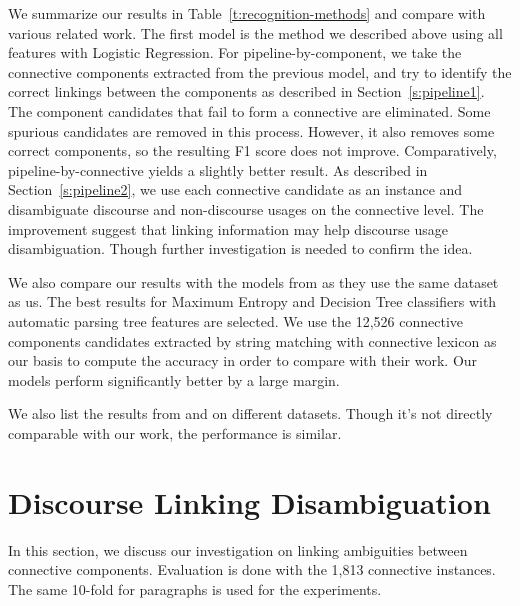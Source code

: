 

We summarize our results in Table~\ref{t:recognition-methods} and
compare with various related work. The first model is the method we described above
using all features with Logistic Regression. For pipeline-by-component,
we take the connective components extracted from the previous model, and try to
identify the correct linkings between the components as described in Section~\ref{s:pipeline1}.
The component candidates that fail to form a connective are eliminated.
Some spurious candidates are removed in this process. However, it also removes some
correct components, so the resulting F1 score does not improve. Comparatively,
pipeline-by-connective yields a slightly better result. As described in
Section~\ref{s:pipeline2}, we use each connective candidate as an instance and
disambiguate discourse and non-discourse usages on the connective level.
The improvement suggest that linking information may help discourse usage disambiguation.
Though further investigation is needed to confirm the idea.

We also compare our results with the models from \cite{li2015automatic} as they use the
same dataset as us. The best results for Maximum Entropy and Decision Tree classifiers with
automatic parsing tree features are selected. We use the 12,526 connective components candidates
extracted by string matching with connective lexicon as our basis to compute the accuracy in order
to compare with their work. Our models perform significantly better by a large margin.

We also list the results from \cite{zhou2012cross} and \cite{li2014cross} on different
datasets. Though it's not directly comparable with our work, the performance is similar.



\section{Discourse Linking Disambiguation}
\label{s:linking-exp}

In this section, we discuss our investigation on linking ambiguities between connective components. Evaluation is done with the 1,813 connective instances. The same 10-fold
for paragraphs is used for the experiments.

